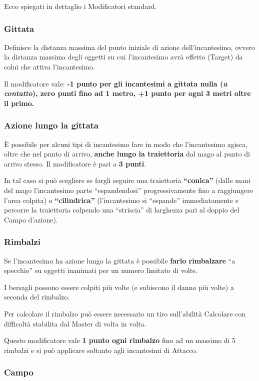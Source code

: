 Ecco spiegati in dettaglio i Modificatori standard.

\subsubsection{Gittata} 
Definisce la distanza massima del punto iniziale di azione
dell'incantesimo, ovvero la distanza massima degli oggetti su cui
l'incantesimo avr\`a effetto (Target) da colui che attiva
l'incantesimo.

Il modificatore vale: \textbf{-1 punto per gli incantesimi a gittata
  nulla (\textit{a contatto}), zero punti fino ad 1 metro, +1 punto per
  ogni 3 metri oltre il primo.}

\iffullversion
\subsubsection{Azione lungo la gittata} 
\`E possibile per alcuni tipi di incantesimo fare in modo che
l'incantesimo agisca, oltre che nel punto di arrivo, \textbf{anche
  lungo la traiettoria} dal mago al punto di arrivo stesso.  Il
modificatore \`e pari a \textbf{3 punti}.

In tal caso si pu\`o scegliere se fargli seguire una traiettoria
\textbf{``conica''} (dalle mani del mago l'incantesimo parte
``espandendosi'' progressivamente fino a raggiungere l'area colpita) o
\textbf{``cilindrica''} (l'incantesimo si ``espande'' immediatamente e
percorre la traiettoria colpendo una ``striscia'' di larghezza pari al
doppio del Campo d'azione).

\subsubsection{Rimbalzi} Se
l'incantesimo ha azione lungo la gittata \`e possibile \textbf{farlo
rimbalzare} ``a specchio'' su oggetti inanimati per un numero limitato
di volte. 

I bersagli possono essere colpiti pi\`u volte (e subiscono
il danno pi\`u volte) a seconda del rimbalzo.

Per calcolare il rimbalzo pu\`o essere necessario un tiro
sull'abilit\`a Calcolare con difficolt\`a stabilita dal Master
di volta in volta.

Questo modificatore vale \textbf{1 punto ogni rimbalzo} fino ad un
massimo di 5 rimbalzi e si pu\`o applicare soltanto agli incantesimi
di Attacco.
\fi

\subsubsection{Campo} 

